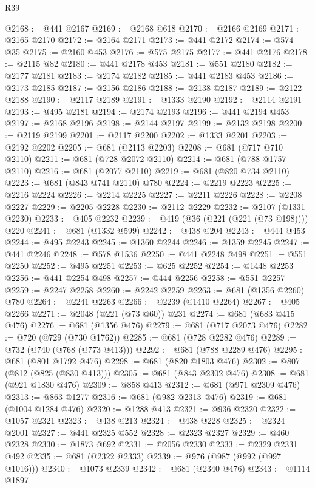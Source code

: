 \begin{lexlean}{R39}
\begin{coremodule}
@2168 := @441 @2167
@2169 := @2168 @618
@2170 := @2166 @2169
@2171 := @2165 @2170
@2172 := @2164 @2171
@2173 := @441 @2172
@2174 := @574 @35
@2175 := @2160 @453
@2176 := @575 @2175
@2177 := @441 @2176
@2178 := @2115 @82
@2180 := @441 @2178 @453
@2181 := @551 @2180
@2182 := @2177 @2181
@2183 := @2174 @2182
@2185 := @441 @2183 @453
@2186 := @2173 @2185
@2187 := @2156 @2186
@2188 := @2138 @2187
@2189 := @2122 @2188
@2190 := @2117 @2189
@2191 := @1333 @2190
@2192 := @2114 @2191
@2193 := @495 @2181
@2194 := @2174 @2193
@2196 := @441 @2194 @453
@2197 := @2168 @2196
@2198 := @2144 @2197
@2199 := @2132 @2198
@2200 := @2119 @2199
@2201 := @2117 @2200
@2202 := @1333 @2201
@2203 := @2192 @2202
@2205 := @681 (@2113 @2203)
@2208 := @681 (@717 @710 @2110)
@2211 := @681 (@728 @2072 @2110)
@2214 := @681 (@788 @1757 @2110)
@2216 := @681 (@2077 @2110)
@2219 := @681 (@820 @734 @2110)
@2223 := @681 (@843 @741 @2110) @780
@2224 := @2219 @2223
@2225 := @2216 @2224
@2226 := @2214 @2225
@2227 := @2211 @2226
@2228 := @2208 @2227
@2229 := @2205 @2228
@2230 := @2112 @2229
@2232 := @2107 (@1331 @2230)
@2233 := @405 @2232
@2239 := @419 (@36 (@221 (@221 (@73 @198)))) @220
@2241 := @681 (@1332 @599)
@2242 := @438 @204
@2243 := @444 @453
@2244 := @495 @2243
@2245 := @1360 @2244
@2246 := @1359 @2245
@2247 := @441 @2246
@2248 := @578 @1536
@2250 := @441 @2248 @498
@2251 := @551 @2250
@2252 := @495 @2251
@2253 := @625 @2252
@2254 := @1448 @2253
@2256 := @441 @2254 @498
@2257 := @444 @2256
@2258 := @551 @2257
@2259 := @2247 @2258
@2260 := @2242 @2259
@2263 := @681 (@1356 @2260) @780
@2264 := @2241 @2263
@2266 := @2239 (@1410 @2264)
@2267 := @405 @2266
@2271 := @2048 (@221 (@73 @60)) @231
@2274 := @681 (@683 @415 @476)
@2276 := @681 (@1356 @476)
@2279 := @681 (@717 @2073 @476)
@2282 := @720 (@729 (@730 @1762))
@2285 := @681 (@728 @2282 @476)
@2289 := @732 (@740 (@768 (@773 @413)))
@2292 := @681 (@788 @2289 @476)
@2295 := @681 (@801 @1792 @476)
@2298 := @681 (@820 @1803 @476)
@2302 := @807 (@812 (@825 (@830 @413)))
@2305 := @681 (@843 @2302 @476)
@2308 := @681 (@921 @1830 @476)
@2309 := @858 @413
@2312 := @681 (@971 @2309 @476)
@2313 := @863 @1277
@2316 := @681 (@982 @2313 @476)
@2319 := @681 (@1004 @1284 @476)
@2320 := @1288 @413
@2321 := @936 @2320
@2322 := @1057 @2321
@2323 := @438 @213
@2324 := @438 @228
@2325 := @2324 @2001
@2327 := @441 @2325 @552
@2328 := @2323 @2327
@2329 := @460 @2328
@2330 := @1873 @692
@2331 := @2056 @2330
@2333 := @2329 @2331 @492
@2335 := @681 (@2322 @2333)
@2339 := @976 (@987 (@992 (@997 @1016)))
@2340 := @1073 @2339
@2342 := @681 (@2340 @476)
@2343 := @1114 @1897

\end{coremodule}
\end{lexlean}
